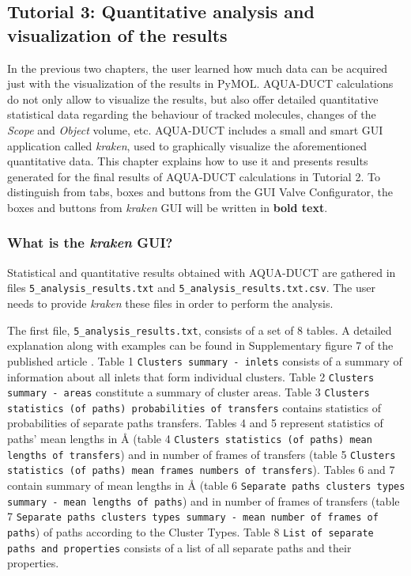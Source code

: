 \documentclass[9pt,tutorial]{livecoms}
\begin{document}
\subsection{Tutorial 3: Quantitative analysis and visualization of the results}

In the previous two chapters, the user learned how much data can be acquired just with the visualization of the results in PyMOL. AQUA-DUCT calculations do not only allow to visualize the results, but also offer detailed  quantitative statistical data regarding the behaviour of tracked molecules, changes of the \textit{Scope} and \textit{Object} volume, etc. AQUA-DUCT includes a small and smart GUI application called \textit{kraken}, used to graphically visualize the aforementioned quantitative data. This chapter explains how to use it and presents results generated for the final results of AQUA-DUCT calculations in Tutorial 2. To distinguish from tabs, boxes and buttons from the GUI Valve Configurator, the boxes and buttons from \textit{kraken} GUI will be written in \textbf{bold text}.

\subsubsection{What is the \emph{kraken} GUI?}
Statistical and quantitative results obtained with AQUA-DUCT are gathered in files \texttt{5\_analysis\_results.txt} and \texttt{5\_analysis\_results.txt.csv}. The user needs to provide \textit{kraken} these files in order to perform the analysis.

The first file, \texttt{5\_analysis\_results.txt}, consists of a set of 8 tables. A detailed explanation along with examples can be found in Supplementary figure 7 of the published article \cite{Magdziarz2020}. 
Table 1 \texttt{Clusters summary - inlets} consists of a summary of information about all inlets that form individual clusters.
Table 2 \texttt{Clusters summary - areas} constitute a summary of cluster areas.
Table 3 \texttt{Clusters statistics (of paths) probabilities of transfers} contains statistics of probabilities of separate paths transfers. Tables 4 and 5 represent statistics of paths' mean lengths in Å (table 4 \texttt{Clusters statistics (of paths) mean lengths of transfers}) and in number of frames of transfers (table 5 \texttt{Clusters statistics (of paths) mean frames numbers of transfers}). Tables 6 and 7 contain summary of mean lengths in Å (table 6 \texttt{Separate paths clusters types summary - mean lengths of paths}) and in number of frames of transfers (table 7 \texttt{Separate paths clusters types summary - mean number of frames of paths}) of paths according to the Cluster Types. Table 8 \texttt{List of separate paths and properties} consists of a list of all separate paths and their properties. 
\end{document}
